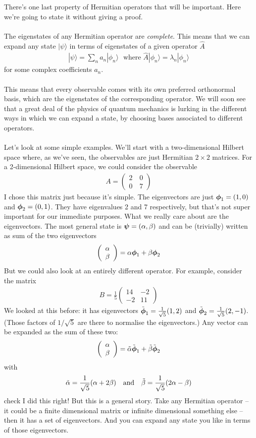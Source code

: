 \documentclass[12pt]{article}
\def\be{\begin{eqnarray}}
\def\ee{\end{eqnarray}}
\newcommand{\nn}{\nonumber}
\newcommand\para{\paragraph{}}
\newcommand{\ft}[2]{{\textstyle\frac{#1}{#2}}}
\newcommand\bphi{\mbox{\boldmath $\phi$}}
\newcommand\bpsi{\mbox{\boldmath $\psi$}}
\newcommand{\ket}[1]{|#1\rangle}
\newcommand{\co}{\color{olive}}
\newcommand{\cblue}{\color{blue}}
\begin{document}
{There's one last property of Hermitian operators that will be important. Here we're going to state it without giving a proof. 

\para
{\co  The eigenstates of any Hermitian operator are {\it complete}. This means that we can expand any state $\ket{\psi}$ in terms of eigenstates of a given operator $\hat{A}$
%
\be \ket{\psi} = \sum_n a_n\ket{\phi_n} \ \ \ \mbox{where $\hat{A}\ket{\phi_n} = \lambda_n\ket{\phi_n}$}\nn\ee
%
for some complex coefficients $a_n$.} 


\para
This means that every observable comes with its own preferred orthonormal basis, which are the eigenstates of the corresponding operator. We will soon see that a great deal of the physics of quantum mechanics is lurking in the different ways in which we can expand a state, by choosing bases associated to different operators. 

\para
Let's look at some simple examples. We'll start with a two-dimensional Hilbert space where, as we've seen, the observables are just Hermitian $2\times 2$ matrices. {\co For a 2-dimensional Hilbert space, we could consider the observable 
%
\be A = \left(\begin{array}{cc} 2 \ & 0 \\ 0\  & 7\end{array}\right)\nn\ee
%
} I chose this matrix just because it's simple. {\co The eigenvectors are just $\bphi_1 = (1,0)$ and $\bphi_2 = (0,1)$.} They have eigenvalues 2 and 7 respectively, but that's not super important for our immediate purposes. What we really care about are the eigenvectors. {\co The most general state is $\bpsi = (\alpha,\beta)$ and can be (trivially) written as sum of the two eigenvectors
%
\be \left(\begin{array}{c} \alpha \\ \beta\end{array}\right) = \alpha \bphi_1 + \beta \bphi_2\nn\ee
%
} But we could also look at an entirely different operator. For example, {\co consider the matrix
%
\be B  = \frac{1}{5}\left(\begin{array}{cc} 14 & -2 \\ -2 & 11 \end{array}\right)\nn\ee
%
We looked at this before: it has eigenvectors $\tilde{\bphi}_1 =\ft{1}{\sqrt{5}}(1,2)$ and $\tilde{\bphi}_2 =\ft{1}{\sqrt{5}}(2,-1)$.} (Those factors of $1/\sqrt{5}$ are there to normalise the eigenvectors.) {\co Any vector can be expanded as the sum of these two: 
%
\be \left(\begin{array}{c} \alpha \\ \beta\end{array}\right) = \tilde{\alpha} \tilde{\bphi}_1 + \tilde{\beta} \tilde{\bphi}_2\nn\ee
%
with
%
\be \tilde{\alpha} = \frac{1}{\sqrt{5}} (\alpha  + 2\beta) \ \ \ {\rm and}\ \ \ \tilde{\beta} = \frac{1}{\sqrt{5}}(2\alpha -\beta)\nn\ee
} 
{\cblue check I did this right!} But this is a general story. Take any Hermitian operator -- it could be a finite dimensional matrix or infinite dimensional something else -- then it has a set of eigenvectors. And you can expand any state you like in terms of those eigenvectors.

}
\end{document}
